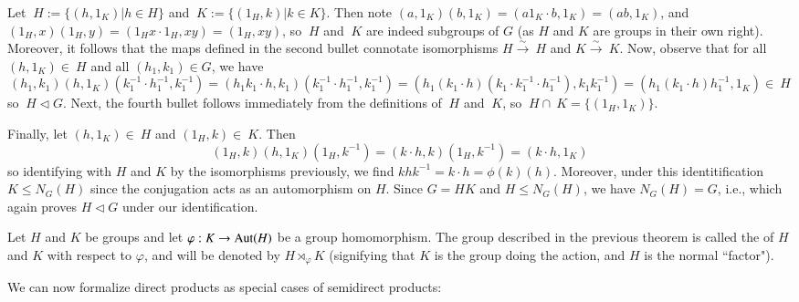 \documentclass[12pt, a4paper, twoside, openright, titlepage]{book}
\begin{document}
\begin{proof*}{}{}
    Let $~H := \{(h,1_K)\vert h\in H\}$ and $~K := \{(1_H,k)\vert k\in K\}$. Then note $(a,1_K)(b,1_K) = (a1_K\cdot b,1_K) = (ab,1_K)$, and $(1_H,x)(1_H,y) = (1_Hx\cdot 1_H,xy) = (1_H,xy)$, so $~H$ and $~K$ are indeed subgroups of $G$ (as $H$ and $K$ are groups in their own right). Moreover, it follows that the maps defined in the second bullet connotate isomorphisms $H\xrightarrow{\sim}~H$ and $K\xrightarrow{\sim}~K$. Now, observe that for all $(h,1_K) \in ~H$ and all $(h_1,k_1) \in G$, we have \begin{equation*}
        (h_1,k_1)(h,1_K)(k_1^{-1}\cdot h_1^{-1},k_1^{-1}) = (h_1k_1\cdot h,k_1)(k_1^{-1}\cdot h_1^{-1},k_1^{-1}) = (h_1(k_1\cdot h)(k_1\cdot k_1^{-1}\cdot h_1^{-1}),k_1k_1^{-1}) = (h_1(k_1\cdot h)h_1^{-1}, 1_K) \in ~H
    \end{equation*}
    so $~H\vartriangleleft G$. Next, the fourth bullet follows immediately from the definitions of $~H$ and $~K$, so $~H\cap ~K = \{(1_H,1_K)\}$.

    Finally, let $(h,1_K) \in ~H$ and $(1_H,k) \in ~K$. Then \begin{equation*}
        (1_H,k)(h,1_K)(1_H,k^{-1}) = (k\cdot h, k)(1_H,k^{-1}) = (k\cdot h, 1_K)
    \end{equation*}
    so identifying with $H$ and $K$ by the isomorphisms previously, we find $khk^{-1} = k\cdot h = \phi(k)(h)$. Moreover, under this identitification $K \leq N_G(H)$ since the conjugation acts as an automorphism on $H$. Since $G = HK$ and $H\leq N_G(H)$, we have $N_G(H) = G$, i.e., which again proves $H\vartriangleleft G$ under our identification.
\end{proof*}


\begin{defn}{}{}
    Let $H$ and $K$ be groups and let $\varphi:K\rightarrow \operatorname{Aut}(H)$ be a group homomorphism. The group described in the previous theorem is called the  of $H$ and $K$ with respect to $\varphi$, and will be denoted by $H\rtimes_{\varphi}K$ (signifying that $K$ is the group doing the action, and $H$ is the normal ``factor").
\end{defn}

We can now formalize direct products as special cases of semidirect products:
\end{document}
